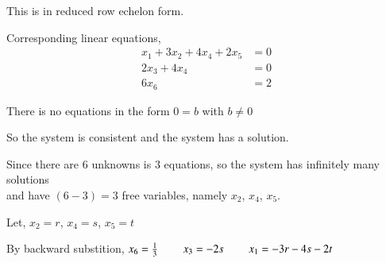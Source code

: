 \documentclass[12pt]{article}
\begin{document}
This is in reduced row echelon form.

Corresponding linear equations,
\vspace{-0.75\baselineskip}
\begin{align*}
   x_1+3x_2+4x_4+2x_5&=0\\
   2x_3+4x_4&=0\\
   6x_6&=2
\end{align*}

There is no equations in the form $0=b$ with $b \neq 0$

So the system is consistent and the system has a solution.

Since there are $6$ unknowns is $3$ equations, so the system has infinitely many solutions\\ and have $(6-3)=3$ free variables, namely $x_2$, $x_4$, $x_5$.


\vspace{2ex}
Let, \tab $x_2=r$, \tab $x_4=s$, \tab $x_5=t$


\vspace{2ex}
By backward substition, \tab 
$x_6=\frac{1}{3} \ \ \ \ \ \  \ \ \  x_3=-2s \ \ \ \ \ \  \ \ \  x_1=-3r-4s-2t$
\end{document}
